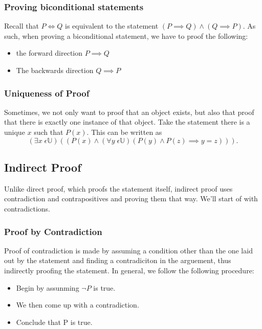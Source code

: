 \documentclass[a4paper]{article}
\begin{document}
\subsubsection{Proving biconditional statements}
Recall that $P \iff Q$ is equivalent to the statement $\left( P \implies Q \right) \wedge \left( Q \implies P \right)  $. As such, when proving a biconditional statement, we have to proof the following:
\begin{itemize}
	\item the forward direction $P \implies Q$
		\item The backwards direction $Q \implies P$
\end{itemize}

\subsubsection{Uniqueness of Proof}
Sometimes, we not only want to proof that an object exists, but also that proof that there is exactly one instance of that object. Take the statement there is a unique $x$ such that  $P \left( x \right) $. This can be written as \[
	\left( \exists  x \; \epsilon \mathbb{U} \right)\left( \left( P\left( x \right) \wedge \left( \forall  y \; \epsilon  \mathbb{U} \right)\left( P\left( y \right) \wedge  P \left( z \right) \implies y =z    \right)   \right)  \right)  
.\] 

\subsection{Indirect Proof}
Unlike direct proof, which proofs the statement itself, indirect proof uses contradiction and contrapositives and proving them that way. We'll start of with contradictions.
\subsubsection{Proof by Contradiction}
Proof of contradiction is made by assuming a condition other than the one laid out by the statement and finding a contradiciton in the arguement, thus indirectly proofing the statement. In general, we follow the following procedure:
\begin{itemize}
	\item Begin by assunming $\neg P$ is true.
	\item We then come up with a contradiction.
	\item Conclude that P is true.
\end{itemize}
\end{document}
